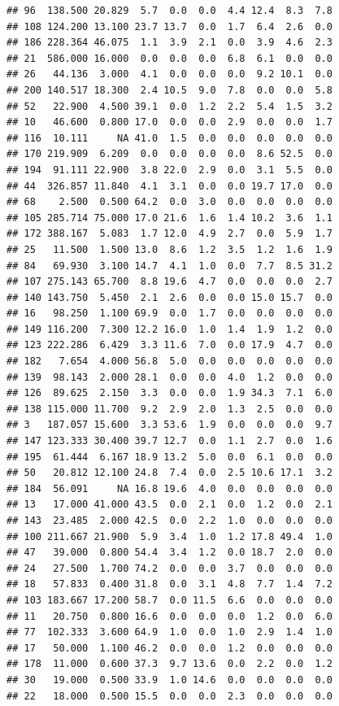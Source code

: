 \documentclass[]{report}
\begin{document}
\begin{verbatim}
## 96  138.500 20.829  5.7  0.0  0.0  4.4 12.4  8.3  7.8
## 108 124.200 13.100 23.7 13.7  0.0  1.7  6.4  2.6  0.0
## 186 228.364 46.075  1.1  3.9  2.1  0.0  3.9  4.6  2.3
## 21  586.000 16.000  0.0  0.0  0.0  6.8  6.1  0.0  0.0
## 26   44.136  3.000  4.1  0.0  0.0  0.0  9.2 10.1  0.0
## 200 140.517 18.300  2.4 10.5  9.0  7.8  0.0  0.0  5.8
## 52   22.900  4.500 39.1  0.0  1.2  2.2  5.4  1.5  3.2
## 10   46.600  0.800 17.0  0.0  0.0  2.9  0.0  0.0  1.7
## 116  10.111     NA 41.0  1.5  0.0  0.0  0.0  0.0  0.0
## 170 219.909  6.209  0.0  0.0  0.0  0.0  8.6 52.5  0.0
## 194  91.111 22.900  3.8 22.0  2.9  0.0  3.1  5.5  0.0
## 44  326.857 11.840  4.1  3.1  0.0  0.0 19.7 17.0  0.0
## 68    2.500  0.500 64.2  0.0  3.0  0.0  0.0  0.0  0.0
## 105 285.714 75.000 17.0 21.6  1.6  1.4 10.2  3.6  1.1
## 172 388.167  5.083  1.7 12.0  4.9  2.7  0.0  5.9  1.7
## 25   11.500  1.500 13.0  8.6  1.2  3.5  1.2  1.6  1.9
## 84   69.930  3.100 14.7  4.1  1.0  0.0  7.7  8.5 31.2
## 107 275.143 65.700  8.8 19.6  4.7  0.0  0.0  0.0  2.7
## 140 143.750  5.450  2.1  2.6  0.0  0.0 15.0 15.7  0.0
## 16   98.250  1.100 69.9  0.0  1.7  0.0  0.0  0.0  0.0
## 149 116.200  7.300 12.2 16.0  1.0  1.4  1.9  1.2  0.0
## 123 222.286  6.429  3.3 11.6  7.0  0.0 17.9  4.7  0.0
## 182   7.654  4.000 56.8  5.0  0.0  0.0  0.0  0.0  0.0
## 139  98.143  2.000 28.1  0.0  0.0  4.0  1.2  0.0  0.0
## 126  89.625  2.150  3.3  0.0  0.0  1.9 34.3  7.1  6.0
## 138 115.000 11.700  9.2  2.9  2.0  1.3  2.5  0.0  0.0
## 3   187.057 15.600  3.3 53.6  1.9  0.0  0.0  0.0  9.7
## 147 123.333 30.400 39.7 12.7  0.0  1.1  2.7  0.0  1.6
## 195  61.444  6.167 18.9 13.2  5.0  0.0  6.1  0.0  0.0
## 50   20.812 12.100 24.8  7.4  0.0  2.5 10.6 17.1  3.2
## 184  56.091     NA 16.8 19.6  4.0  0.0  0.0  0.0  0.0
## 13   17.000 41.000 43.5  0.0  2.1  0.0  1.2  0.0  2.1
## 143  23.485  2.000 42.5  0.0  2.2  1.0  0.0  0.0  0.0
## 100 211.667 21.900  5.9  3.4  1.0  1.2 17.8 49.4  1.0
## 47   39.000  0.800 54.4  3.4  1.2  0.0 18.7  2.0  0.0
## 24   27.500  1.700 74.2  0.0  0.0  3.7  0.0  0.0  0.0
## 18   57.833  0.400 31.8  0.0  3.1  4.8  7.7  1.4  7.2
## 103 183.667 17.200 58.7  0.0 11.5  6.6  0.0  0.0  0.0
## 11   20.750  0.800 16.6  0.0  0.0  0.0  1.2  0.0  6.0
## 77  102.333  3.600 64.9  1.0  0.0  1.0  2.9  1.4  1.0
## 17   50.000  1.100 46.2  0.0  0.0  1.2  0.0  0.0  0.0
## 178  11.000  0.600 37.3  9.7 13.6  0.0  2.2  0.0  1.2
## 30   19.000  0.500 33.9  1.0 14.6  0.0  0.0  0.0  0.0
## 22   18.000  0.500 15.5  0.0  0.0  2.3  0.0  0.0  0.0
\end{verbatim}
\end{document}
